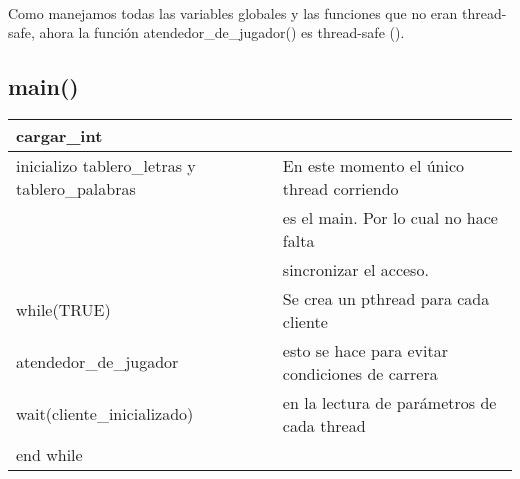 \paragraph{}
Como manejamos todas las variables globales y las funciones que no eran thread-safe, ahora la funci\'on atendedor\_de\_jugador() es thread-safe (\ts).

\subsection{main()}

\begin{tabular}{|l|l|}
\hline
\hspace*{0cm} cargar\_int \ts 						& \\
\hline
\hspace*{0cm} inicializo tablero\_letras y tablero\_palabras \nts	& En este momento el \'unico thread corriendo \\
									& es el main. Por lo cual no hace falta \\
									& sincronizar el acceso. \\
\hline
\hspace*{0cm} while(TRUE) 						& Se crea un pthread para cada cliente \\
\hspace*{0.5cm} atendedor\_de\_jugador \ts 				& esto se hace para evitar condiciones de carrera \\
\hspace*{0.5cm} wait(cliente\_inicializado) 				& en la lectura de par\'ametros de cada thread \\
\hspace*{0cm} end while 						& \\
\hline
\end{tabular}
